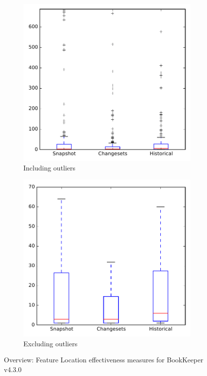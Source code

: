 
\begin{figure}
    \centering
    \begin{subfigure}{.4\textwidth}
        \centering
        \includegraphics[height=0.4\textheight]{figures/flt/all_bookkeeper}
        \caption{Including outliers}\label{fig:flt:all:bookkeeper_outlier}
    \end{subfigure}%
    \begin{subfigure}{.4\textwidth}
        \centering
        \includegraphics[height=0.4\textheight]{figures/flt/all_bookkeeper_no_outlier}
        \caption{Excluding outliers}\label{fig:flt:all:bookkeeper_no_outlier}
    \end{subfigure}
\caption{Overview: Feature Location effectiveness measures for BookKeeper v4.3.0}
\label{fig:flt:all:bookkeeper}
\end{figure}
